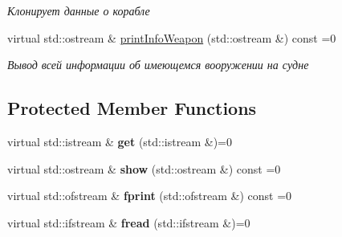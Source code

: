 \begin{DoxyCompactItemize}
\begin{DoxyCompactList}\small\item\em Клонирует данные о корабле \end{DoxyCompactList}\item 
\mbox{\label{class_aircraft_carrier_group_1_1_ship_afcee497df82ac456addd1352d7af6967}} 
virtual std\+::ostream \& \mbox{\hyperlink{class_aircraft_carrier_group_1_1_ship_afcee497df82ac456addd1352d7af6967}{print\+Info\+Weapon}} (std\+::ostream \&) const =0
\begin{DoxyCompactList}\small\item\em Вывод всей информации об имеющемся вооружении на судне \end{DoxyCompactList}\end{DoxyCompactItemize}
\subsection*{Protected Member Functions}
\begin{DoxyCompactItemize}
\item 
\mbox{\label{class_aircraft_carrier_group_1_1_ship_a13833e02db6cfb91872bcda2b9ca5fc3}} 
virtual std\+::istream \& {\bfseries get} (std\+::istream \&)=0
\item 
\mbox{\label{class_aircraft_carrier_group_1_1_ship_a584c2ca5c6721b907dd5519edc7799df}} 
virtual std\+::ostream \& {\bfseries show} (std\+::ostream \&) const =0
\item 
\mbox{\label{class_aircraft_carrier_group_1_1_ship_a0eb889e790d0cd8b563160cd70dc46a0}} 
virtual std\+::ofstream \& {\bfseries fprint} (std\+::ofstream \&) const =0
\item 
\mbox{\label{class_aircraft_carrier_group_1_1_ship_a5397a72a89f919825648caa725ad8dfc}} 
virtual std\+::ifstream \& {\bfseries fread} (std\+::ifstream \&)=0
\end{DoxyCompactItemize}
